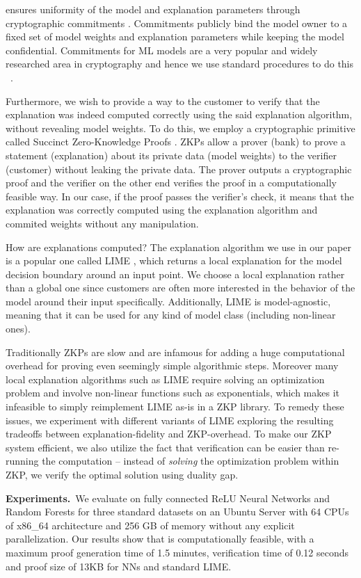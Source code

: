 \name ensures uniformity of the model and explanation parameters through cryptographic commitments \cite{blum1983coin}. Commitments publicly bind the model owner to a fixed set of model weights and explanation parameters while keeping the model confidential. Commitments for ML models are a very popular and widely researched area in cryptography and hence we use standard procedures to do this ~\citep{kate2010constant}.

Furthermore, we wish to provide a way to the customer to verify that the explanation was indeed computed correctly using the said explanation algorithm, without revealing model weights. To do this, we employ a cryptographic primitive called Succinct Zero-Knowledge Proofs \cite{GMR, GMW}. ZKPs allow a prover (bank) to prove a statement (explanation) about its private data (model weights) to the verifier (customer) without leaking the private data. The prover outputs a cryptographic proof and the verifier on the other end verifies the proof in a computationally feasible way. In our case, if the proof passes the verifier's check, it means that the explanation was correctly computed using the explanation algorithm and commited weights without any manipulation.

How are explanations computed? The explanation algorithm we use in our paper is a popular one called LIME \cite{ribeiro2016should}, which returns a local explanation for the model decision boundary around an input point. We choose a local explanation rather than a global one since customers are often more interested in the behavior of the model around their input specifically. Additionally, LIME is model-agnostic, meaning that it can be used for any kind of model class (including non-linear ones).

Traditionally ZKPs are slow and are infamous for adding a huge computational overhead for proving even seemingly simple algorithmic steps. Moreover many local explanation algorithms such as LIME require solving an optimization problem and involve non-linear functions such as exponentials, which makes it infeasible to simply reimplement LIME as-is in a ZKP library. To remedy these issues, we experiment with different variants of LIME exploring the resulting tradeoffs between explanation-fidelity and ZKP-overhead. To make our ZKP system efficient, we also utilize the fact that verification can be easier than re-running the computation -- instead of \textit{solving} the optimization problem within ZKP, we verify the optimal solution using duality gap.




\textbf{Experiments.}~We evaluate \name on fully connected ReLU Neural Networks and Random Forests for three standard datasets on an Ubuntu Server with 64 CPUs of x86\_64 architecture and 256 GB of memory without any explicit parallelization. Our results show that \name is computationally feasible, with a maximum proof generation time of 1.5 minutes, verification time of 0.12 seconds and proof size of 13KB for NNs and standard LIME.